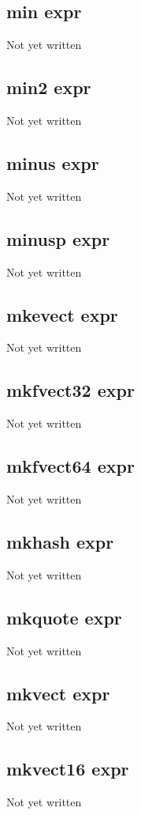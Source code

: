 \documentclass[a4paper,11pt]{article}
\begin{document}
\subsection{\ttfamily min expr}
Not yet written

\subsection{\ttfamily min2 expr}
Not yet written

\subsection{\ttfamily minus expr}
Not yet written

\subsection{\ttfamily minusp expr}
Not yet written

\subsection{\ttfamily mkevect expr}
Not yet written

\subsection{\ttfamily mkfvect32 expr}
Not yet written

\subsection{\ttfamily mkfvect64 expr}
Not yet written

\subsection{\ttfamily mkhash expr}
Not yet written

\subsection{\ttfamily mkquote expr}
Not yet written

\subsection{\ttfamily mkvect expr}
Not yet written

\subsection{\ttfamily mkvect16 expr}
Not yet written
\end{document}
